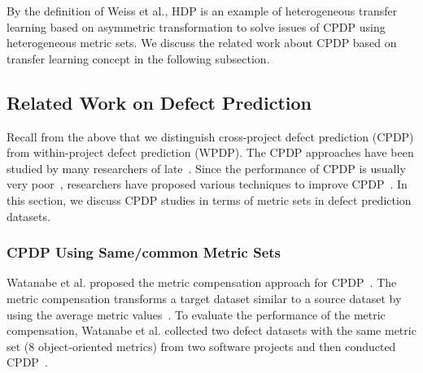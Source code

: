 By the definition of Weiss et al., HDP is an example of heterogeneous transfer learning based on asymmetric transformation to solve issues of CPDP using heterogeneous metric sets. We discuss the related work about CPDP based on transfer learning concept in the following subsection.

\subsection{Related Work on Defect Prediction}
\label{sec:Background}
Recall from the above that we distinguish cross-project defect prediction (CPDP) from within-project defect prediction (WPDP).
The CPDP approaches have been studied by many researchers
of late~\cite{Canfora13,Ma12,Nam13,Panichella14,Rahman12,Ryu14,Ryu15,Turhan09,Zhang15,Zimmermann09}. Since the performance
of CPDP is usually very poor~\cite{Zimmermann09}, researchers have proposed various techniques to
improve CPDP~\cite{Canfora13,Ma12,Nam13,Panichella14,Ryu14,Ryu15,Turhan09,Watanabe08}. In this section, we discuss CPDP studies in terms of metric sets in defect prediction datasets.


\subsubsection{CPDP Using Same/common Metric Sets}
Watanabe et al. proposed the metric compensation approach for
CPDP~\cite{Watanabe08}. The metric compensation transforms a target dataset
similar to a source dataset by using the average metric
values~\cite{Watanabe08}.
To evaluate the performance of the metric compensation, Watanabe et al. collected
two defect datasets with the same metric set (8 object-oriented
metrics) from two software projects and then conducted
CPDP~\cite{Watanabe08}.

